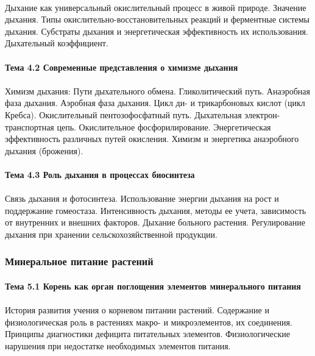 \paragraph*{}Дыхание как универсальный окислительный процесс в живой природе. Значение дыхания. Типы окислительно-восстановительных реакций и ферментные системы дыхания. Субстраты дыхания и энергетическая эффективность их использования. Дыхательный коэффициент.

\paragraph*{Тема 4.2 Современные представления о химизме дыхания}

\paragraph*{}Химизм дыхания: Пути дыхательного обмена. Гликолитический путь. Анаэробная фаза дыхания. Аэробная фаза дыхания. Цикл ди- и трикарбоновых кислот (цикл Кребса). Окислительный пентозофосфатный путь. Дыхательная электрон-транспортная цепь. Окислительное фосфорилирование. Энергетическая эффективность различных путей окис­ления. Химизм и энергетика анаэробного дыхания (брожения).

\paragraph*{Тема 4.3 Роль дыхания в процессах биосинтеза}

\paragraph*{}Связь дыхания и фотосинтеза. Использование энергии дыхания на рост и поддержание гомеостаза. Интенсивность дыхания, методы ее учета, зависимость от внутренних и внешних факторов. Дыхание больного растения.
Регулирование дыхания при хранении сельскохозяйственной продукции.

\subsubsection{Минеральное питание растений}

\paragraph*{Тема 5.1 Корень как орган поглощения элементов минерального питания}

\paragraph*{}История развития учения о корневом питании растений. Содержание и физиологическая роль в растениях макро- и микроэлементов, их соединения. Принципы диагностики дефицита питательных элементов. Физиологические нарушения при недостатке необходимых элементов питания.

